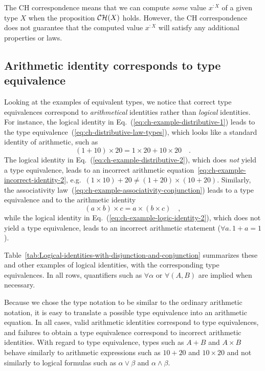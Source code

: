 The CH correspondence means that we can compute \emph{some} value
$x^{:X}$ of a given type $X$ when the proposition ${\cal CH}(X)$
holds. However, the CH correspondence does not guarantee that the
computed value $x^{:X}$ will satisfy any additional properties or
laws.

\subsection{Arithmetic identity corresponds to type equivalence}

Looking at the examples of equivalent types, we notice that correct
type equivalences correspond to \emph{arithmetical} identities rather
than \emph{logical} identities. For instance, the logical identity
in Eq.~(\ref{eq:ch-example-distributive-1}) leads to the type equivalence~(\ref{eq:ch-distributive-law-types}),
which looks like a standard identity of arithmetic, such as
\[
(1+10)\times20=1\times20+10\times20\quad.
\]
The logical identity in Eq.~(\ref{eq:ch-example-distributive-2}),
which does \emph{not} yield a type equivalence, leads to an incorrect
arithmetic equation~\ref{eq:ch-example-incorrect-identity-2}, e.g.~$\left(1\times10\right)+20\neq\left(1+20\right)\times\left(10+20\right)$.
Similarly, the associativity law~(\ref{eq:ch-example-associativity-conjunction})
leads to a type equivalence and to the arithmetic identity
\[
\left(a\times b\right)\times c=a\times\left(b\times c\right)\quad,
\]
while the logical identity in Eq.~(\ref{eq:ch-example-logic-identity-2}),
which does not yield a type equivalence, leads to an incorrect arithmetic
statement ($\forall a.\,1+a=1$).

Table~\ref{tab:Logical-identities-with-disjunction-and-conjunction}
summarizes these and other examples of logical identities, with the
corresponding type equivalences. In all rows, quantifiers such as
$\forall\alpha$ or $\forall(A,B)$ are implied when necessary.

Because we chose the type notation to be similar to the ordinary arithmetic
notation, it is easy to translate a possible type equivalence into
an arithmetic equation. In all cases, valid arithmetic identities
correspond to type equivalences, and failures to obtain a type equivalence
correspond to incorrect arithmetic identities. With regard to type
equivalence, types such as $A+B$ and $A\times B$ behave similarly
to arithmetic expressions such as $10+20$ and $10\times20$ and not
similarly to logical formulas such as $\alpha\vee\beta$ and $\alpha\wedge\beta$.

